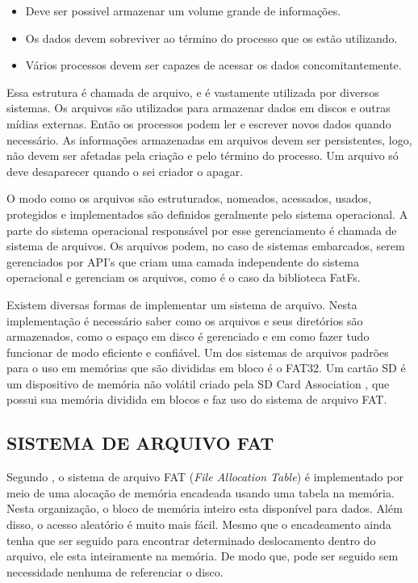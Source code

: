 \begin{itemize}
    \item Deve ser possivel armazenar um volume grande de informações.
    \item Os dados devem sobreviver ao término do processo que os estão utilizando.
    \item Vários processos devem ser capazes de acessar os dados concomitantemente.
\end{itemize}

Essa estrutura é chamada de arquivo, e é vastamente utilizada por diversos sistemas. Os arquivos são utilizados para armazenar dados em discos e outras mídias externas. Então os processos podem ler e escrever novos dados quando necessário. As informações armazenadas em arquivos devem ser persistentes, logo, não devem ser afetadas pela criação e pelo término do processo. Um arquivo só deve desaparecer quando o sei criador o apagar.

O modo como os arquivos são estruturados, nomeados, acessados, usados, protegidos e implementados são definidos geralmente pelo sistema operacional. A parte do sistema operacional responsável por esse gerenciamento é chamada de sistema de arquivos. Os arquivos podem, no caso de sistemas embarcados, serem gerenciados por API's que criam uma camada independente do sistema operacional e gerenciam os arquivos, como é o caso da biblioteca FatFs. 

Existem diversas formas de implementar um sistema de arquivo. Nesta implementação é necessário saber como os arquivos e seus diretórios são armazenados, como o espaço em disco é gerenciado e em como fazer tudo funcionar de modo eficiente e confiável. 
Um dos sistemas de arquivos padrões para o uso em memórias que são divididas em bloco é o FAT32. 
Um cartão SD é um dispositivo de memória não volátil criado pela SD Card Association \cite{SDCARD}, que possui sua memória dividida em blocos e faz uso do sistema de arquivo FAT.




\subsection{SISTEMA DE ARQUIVO FAT}

Segundo , o sistema de arquivo FAT (\textit{File Allocation Table}) é implementado por meio de uma alocação de memória encadeada usando uma tabela na memória. Nesta organização, o bloco de memória inteiro esta disponível para dados. Além disso, o acesso aleatório é muito mais fácil. Mesmo que o encadeamento ainda tenha que ser seguido para encontrar determinado deslocamento dentro do arquivo, ele esta inteiramente na memória. De modo que, pode ser seguido sem necessidade nenhuma de referenciar o disco.

